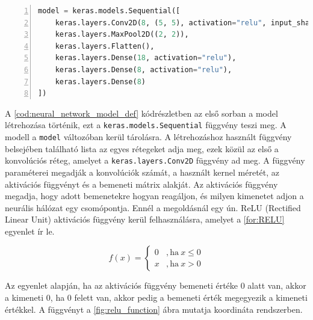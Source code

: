 \begin{codewrapper}
\begin{lstlisting}[language=Python, numbers=left, caption={A neurális hálózat konfigurálása.}, label={cod:neural_network_model_def}]
model = keras.models.Sequential([
    keras.layers.Conv2D(8, (5, 5), activation="relu", input_shape=(18, 18, 6)),
    keras.layers.MaxPool2D((2, 2)),
    keras.layers.Flatten(),
    keras.layers.Dense(18, activation="relu"),
    keras.layers.Dense(8, activation="relu"),
    keras.layers.Dense(8)
])
\end{lstlisting}
\end{codewrapper}

\par A \ref{cod:neural_network_model_def} kódrészletben az első sorban a model létrehozása történik, ezt a \lstinline{keras.models.Sequential} függvény\cite{chollet2015keras,tensorflow_docs} teszi meg. A modell a \lstinline{model} változóban kerül tárolásra. A létrehozáshoz használt függvény belsejében található lista az egyes rétegeket adja meg, ezek közül az első a konvolúciós réteg, amelyet a \lstinline{keras.layers.Conv2D} függvény\cite{chollet2015keras,tensorflow_docs} ad meg. A függvény paraméterei megadják a konvolúciók számát, a használt kernel méretét, az aktivációs függvényt és a bemeneti mátrix alakját. Az aktivációs függvény megadja, hogy adott bemenetekre hogyan reagáljon, és milyen kimenetet adjon a neurális hálózat egy csomópontja\cite{hinkelmannneural}. Ennél a megoldásnál egy ún. ReLU (Rectified Linear Unit) aktivációs függvény kerül felhasználásra, amelyet a \ref{for:RELU} egyenlet\cite{RELU2010} ír le.

\begin{equation}
    f(x) =
    \begin{cases}
        0 & ,\text{ha}\ x\le0 \\
        x & ,\text{ha}\ x>0
    \end{cases}
    \label{for:RELU}
\end{equation}

\par Az egyenlet alapján, ha az aktivációs függvény bemeneti értéke 0 alatt van, akkor a kimeneti 0, ha 0 felett van, akkor pedig a bemeneti érték megegyezik a kimeneti értékkel. A függvényt a \ref{fig:relu_function} ábra mutatja koordináta rendszerben.

